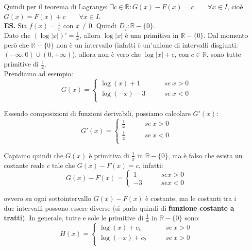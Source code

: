 \documentclass{article}
\begin{document}
\noindent Quindi per il teorema di Lagrange: $\exists c \in \mathbb{R} : G(x) - F(x) = c \qquad \forall x \in I$, cioè $G(x) = F(x) + c \qquad \forall x \in I$.\\

\noindent\textbf{ES.} Sia $f(x) = \frac{1}{x}$ con $x \neq 0$. Quindi $D_f: \mathbb{R} - \{0\}$.\\
Dato che $(\log|x|)' = \frac{1}{x}$, allora $\log|x|$ è una primitiva in $\mathbb{R} - \{0\}$. Dal momento però che $\mathbb{R} - \{0\}$ non è un intervallo (infatti è un'unione di intervalli disgiunti: $(-\infty, 0) \cup (0, +\infty)$), allora non è vero che $\log|x| + c$, con $c \in \mathbb{R}$, sono tutte primitive di $\frac{1}{x}$.\\
Prendiamo ad esempio: 
\begin{equation*}
    G(x) = \begin{cases}
        \log(x) + 1 & \qquad se \ x > 0\\
        \log(-x) - 3 & \qquad se \ x < 0\\
    \end{cases}
\end{equation*}

\noindent Essendo composizioni di funzioni derivabili, possiamo calcolare $G'(x)$:
\begin{equation*}
    G'(x) = \begin{cases}
        \frac{1}{x} & \qquad se \ x > 0\\
        \frac{1}{x} & \qquad se \ x < 0\\
    \end{cases}
\end{equation*}

\noindent Capiamo quindi che $G(x)$ è primitiva di $\frac{1}{x}$ in $\mathbb{R} - \{0\}$, ma è falso che esista un costante reale $c$ tale che $G(x) - F(x) = c$, infatti:
\begin{equation*}
    G(x) - F(x) = \begin{cases*}
        1 & \qquad se x > 0 \\
        -3 & \qquad se x < 0
    \end{cases*}
\end{equation*}

\noindent ovvero su ogni sottointervallo $G(x) - F(x)$ è costante, ma le costanti tra i due intervalli possono essere diverse (si parla quindi di \textbf{funzione costante a tratti}). In generale, tutte e sole le primitive di $\frac{1}{x}$ in $\mathbb{R} - \{0\}$ sono:
\begin{equation*}
    H(x) = \begin{cases}
        \log(x) + c_1 & \qquad se \ x > 0 \\
        \log(-x) + c_2 & \qquad se \ x > 0 \\
    \end{cases}
\end{equation*}
\end{document}

